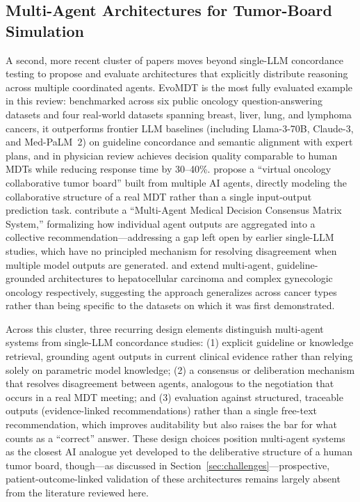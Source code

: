 \documentclass{article}
\begin{document}
\subsection{Multi-Agent Architectures for Tumor-Board Simulation}
\label{sec:multiagent}

A second, more recent cluster of papers moves beyond single-LLM concordance testing to propose and evaluate architectures that explicitly distribute reasoning across multiple coordinated agents. EvoMDT \cite{liu2026} is the most fully evaluated example in this review: benchmarked across six public oncology question-answering datasets and four real-world datasets spanning breast, liver, lung, and lymphoma cancers, it outperforms frontier LLM baselines (including Llama-3-70B, Claude-3, and Med-PaLM~2) on guideline concordance and semantic alignment with expert plans, and in physician review achieves decision quality comparable to human MDTs while reducing response time by 30--40\%. \citet{wang2025jco} propose a ``virtual oncology collaborative tumor board'' built from multiple AI agents, directly modeling the collaborative structure of a real MDT rather than a single input-output prediction task. \citet{han2025} contribute a ``Multi-Agent Medical Decision Consensus Matrix System,'' formalizing how individual agent outputs are aggregated into a collective recommendation---addressing a gap left open by earlier single-LLM studies, which have no principled mechanism for resolving disagreement when multiple model outputs are generated. \citet{saenz2026} and \citet{kuerbanjiang2025} extend multi-agent, guideline-grounded architectures to hepatocellular carcinoma and complex gynecologic oncology respectively, suggesting the approach generalizes across cancer types rather than being specific to the datasets on which it was first demonstrated.

Across this cluster, three recurring design elements distinguish multi-agent systems from single-LLM concordance studies: (1) explicit guideline or knowledge retrieval, grounding agent outputs in current clinical evidence rather than relying solely on parametric model knowledge; (2) a consensus or deliberation mechanism that resolves disagreement between agents, analogous to the negotiation that occurs in a real MDT meeting; and (3) evaluation against structured, traceable outputs (evidence-linked recommendations) rather than a single free-text recommendation, which improves auditability but also raises the bar for what counts as a ``correct'' answer. These design choices position multi-agent systems as the closest AI analogue yet developed to the deliberative structure of a human tumor board, though---as discussed in Section~\ref{sec:challenges}---prospective, patient-outcome-linked validation of these architectures remains largely absent from the literature reviewed here.
\end{document}
